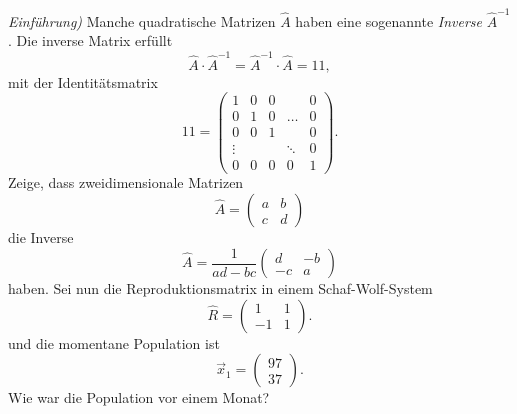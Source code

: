  \subexercise[%
  topic={Matrixinversion},
    ]
    \emph{Einf\"uhrung)}
    Manche quadratische Matrizen $\hat A$ haben eine sogenannte
    \textit{Inverse} $\hat A^{-1}$. Die inverse Matrix erf\"ullt
    \begin{equation}
        \hat A \cdot \hat A^{-1} = \hat A^{-1}\cdot \hat A = 1\!\!\!1,
    \end{equation}
    mit der Identit\"atsmatrix 
    \begin{equation}
        1\!\!\!1 = \left(\begin{matrix}
                1 & 0 & 0& \ & 0\\
                0 & 1 & 0&\dots & 0\\
                0 & 0 & 1 &\ & 0\\
                \vdots & \ & \ & \ddots & 0\\
                0 & 0 & 0 & 0 & 1 
            \end{matrix}\right).
    \end{equation}
    Zeige, dass zweidimensionale Matrizen
    \begin{equation}
        \hat A = \left(\begin{matrix} a & b \\ c & d
            \end{matrix}\right)
    \end{equation}
    die Inverse
    \begin{equation}
        \hat A = \frac{1}{ad-bc}\left(\begin{matrix} d & -b \\ -c & a
            \end{matrix}\right)
    \end{equation}
    haben.
    Sei nun die Reproduktionsmatrix in einem Schaf-Wolf-System
    \begin{equation}
        \hat R = \left(\begin{matrix} 1 & 1 \\ -1 & 1
            \end{matrix}\right).
    \end{equation}
    und die momentane Population ist
   \begin{equation}
       \vec x_1 = \left(\begin{matrix}
               97\\
               37
           \end{matrix}\right).
   \end{equation}
   Wie war die Population vor einem Monat?
 
